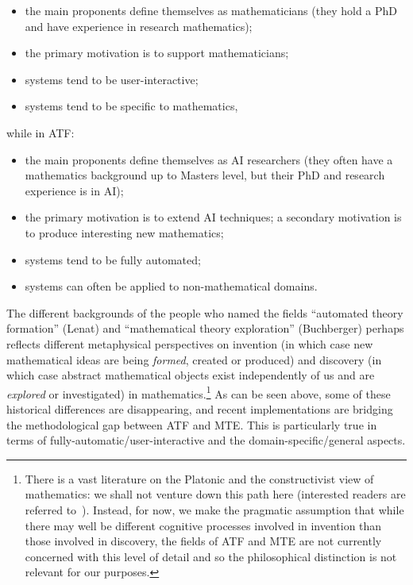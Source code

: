 \begin{itemize}
\item the main proponents define themselves as mathematicians (they
  hold a PhD and have experience in research mathematics);
\item the primary motivation is to support mathematicians;
\item systems tend to be user-interactive;
\item systems tend to be specific to mathematics,
\end{itemize}

while in ATF:

\begin{itemize}
\item the main proponents define themselves as AI researchers (they
  often have a mathematics background up to Masters level, but their
  PhD and research experience is in AI);
\item the primary motivation is to extend AI techniques; a secondary
  motivation is to produce interesting new mathematics;
\item systems tend to be fully automated;
\item systems can often be applied to non-mathematical domains.
\end{itemize}

The different backgrounds of the people who named the fields
``automated theory formation'' (Lenat) and ``mathematical theory
exploration'' (Buchberger) perhaps reflects different metaphysical
perspectives on invention (in which case new mathematical ideas are
being {\em formed}, created or produced) and discovery (in which case
abstract mathematical objects exist independently of us and are {\em
  explored} or investigated) in mathematics.\footnote{There is a vast
  literature on the Platonic and the constructivist view of
  mathematics: we shall not venture down this path here (interested
  readers are referred to~\cite{hersh:97,shapiro}). Instead, for now,
  we make the pragmatic assumption that while there may well be
  different cognitive processes involved in invention than those
  involved in discovery, the fields of ATF and MTE are not currently
  concerned with this level of detail and so the philosophical
  distinction is not relevant for our purposes.} As can be seen above,
some of these historical differences are disappearing, and recent
implementations are bridging the methodological gap between ATF and MTE. This is
particularly true in terms of fully-automatic/user-interactive and the
domain-specific/general aspects.

